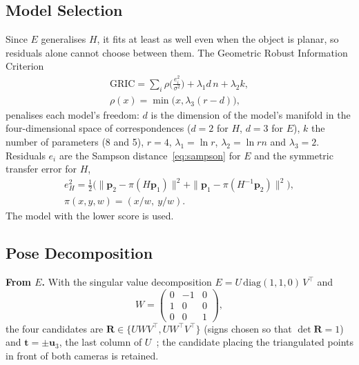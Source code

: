\documentclass[journal]{IEEEtran}
\newcommand{\R}{\mathbf{R}}
\newcommand{\tv}{\mathbf{t}}
\begin{document}
\subsection{Model Selection}
Since $E$ generalises $H$, it fits at least as well even when the object is planar, so residuals alone cannot choose between them. The Geometric Robust Information Criterion~\cite{torr}
\begin{gather}
  \mathrm{GRIC} = \sum_i \rho\!\Big(\frac{e_i^2}{\sigma^2}\Big) + \lambda_1 d\,n + \lambda_2 k,\\
  \rho(x)=\min\!\big(x,\lambda_3(r-d)\big),
\end{gather}
penalises each model's freedom: $d$ is the dimension of the model's manifold in the four-dimensional space of correspondences ($d=2$ for $H$, $d=3$ for $E$), $k$ the number of parameters (8 and 5), $r=4$, $\lambda_1=\ln r$, $\lambda_2=\ln rn$ and $\lambda_3=2$. Residuals $e_i$ are the Sampson distance~\eqref{eq:sampson} for $E$ and the symmetric transfer error for $H$,
\begin{gather}
  e_H^2=\tfrac12\Big(\|\mathbf{p}_2-\pi(H\mathbf{p}_1)\|^2+\|\mathbf{p}_1-\pi(H^{-1}\mathbf{p}_2)\|^2\Big),\label{eq:transfer}\\
  \pi(x,y,w)=(x/w,\ y/w).\nonumber
\end{gather} The model with the lower score is used.

\subsection{Pose Decomposition}
\textbf{From $E$.} With the singular value decomposition $E=U\,\mathrm{diag}(1,1,0)\,V^\top$ and
\begin{equation}
  W=\begin{pmatrix}0&-1&0\\1&0&0\\0&0&1\end{pmatrix},
\end{equation}
the four candidates are $\R\in\{UWV^\top, UW^\top V^\top\}$ (signs chosen so that $\det\R=1$) and $\tv=\pm\mathbf{u}_3$, the last column of $U$~\cite{hz}; the candidate placing the triangulated points in front of both cameras is retained.
\end{document}
